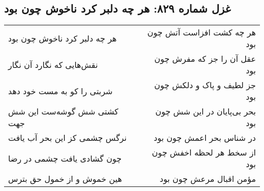 \begin{center}
\section*{غزل شماره ۸۲۹: هر چه دلبر کرد ناخوش چون بود}
\label{sec:0829}
\begin{longtable}{l p{0.5cm} r}
هر چه دلبر کرد ناخوش چون بود
&&
هر چه کشت افزاست آتش چون بود
\\
نقش‌هایی که نگارد آن نگار
&&
عقل آن را جز که مفرش چون بود
\\
شربتی را کو به مست خود دهد
&&
جز لطیف و پاک و دلکش چون بود
\\
کشتی شش گوشه‌ست این شش جهت
&&
بحر بی‌پایان در این شش چون بود
\\
نرگس چشمی کز این بحر آب یافت
&&
در شناس بحر اعمش چون بود
\\
چون گشادی یافت چشمی در رضا
&&
از سخط هر لحظه اخفش چون بود
\\
هین خموش و از خمول حق بترس
&&
مؤمن اقبال مرعش چون بود
\\
\end{longtable}
\end{center}
